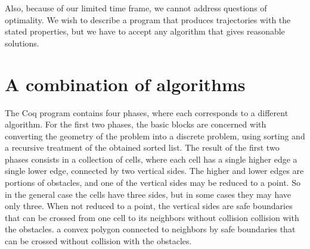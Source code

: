 \documentclass{easychair}
\begin{document}
Also, because of our limited time frame, we cannot address
questions of optimality.  We wish to describe a program that produces
trajectories with the stated properties, but we have to accept any
algorithm that gives reasonable solutions.
\section{A combination of algorithms}
The Coq program contains four phases, where each corresponds to a
different algorithm.  For the first two phases, the basic blocks are
concerned with converting the geometry of the problem into a discrete
problem, using sorting and a recursive treatment of the obtained
sorted list.  The result of the first two phases consists in a
collection of cells, where each cell has a single higher edge a single
lower edge, connected by two vertical sides.  The higher and lower
edges are portions of obstacles, and one of the vertical sides may be
reduced to a point.  So in the general case the cells have three
sides, but in some cases they may have only three.  When not reduced
to a point, the vertical sides are safe boundaries that can be crossed
from one cell to its neighbors without collision collision with the
obstacles.  a convex polygon connected to neighbors by safe boundaries
that can be crossed without collision with the obstacles.
\end{document}
